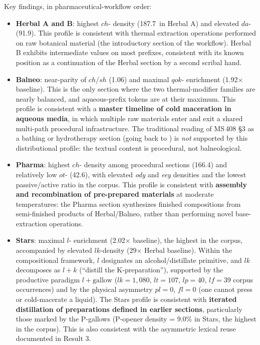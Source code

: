 \documentclass[11pt,a4paper]{article}
\begin{document}
Key findings, in pharmaceutical-workflow order:

\begin{itemize}[leftmargin=*,itemsep=4pt]
\item \textbf{Herbal A and B}: highest $ch$- density (187.7\textperthousand\ in Herbal A) and elevated $da$- (91.9\textperthousand). This profile is consistent with thermal extraction operations performed on raw botanical material (the introductory section of the workflow). Herbal B exhibits intermediate values on most prefixes, consistent with its known position as a continuation of the Herbal section by a second scribal hand.

\item \textbf{Balneo}: near-parity of $ch$/$sh$ (1.06) and maximal $qok$- enrichment (1.92$\times$ baseline). This is the only section where the two thermal-modifier families are nearly balanced, and aqueous-prefix tokens are at their maximum. This profile is consistent with a \textbf{master timeline of cold maceration in aqueous media}, in which multiple raw materials enter and exit a shared multi-path procedural infrastructure. The traditional reading of MS\,408 \S3 as a bathing or hydrotherapy section (going back to \citealp{Newbold1928,DImperio1978}) is \textit{not} supported by this distributional profile: the textual content is procedural, not balneological.

\item \textbf{Pharma}: highest $ch$- density among procedural sections (166.4\textperthousand) and relatively low $ot$- (42.6\textperthousand), with elevated \textit{ody} and \textit{eey} densities and the lowest passive/active ratio in the corpus. This profile is consistent with \textbf{assembly and recombination of pre-prepared materials} at moderate temperatures: the Pharma section synthesizes finished compositions from semi-finished products of Herbal/Balneo, rather than performing novel base-extraction operations.

\item \textbf{Stars}: maximal $l$- enrichment (2.02$\times$ baseline), the highest in the corpus, accompanied by elevated $lk$-density (29$\times$ Herbal baseline). Within the compositional framework, $l$ designates an alcohol/distillate primitive, and $lk$ decomposes as $l + k$ (``distill the K-preparation''), supported by the productive paradigm $l + \mathrm{gallow}$ ($lk = 1{,}080$, $lt = 107$, $lp = 40$, $lf = 39$ corpus occurrences) and by the physical asymmetry $pl = 0$, $fl = 0$ (one cannot press or cold-macerate a liquid). The Stars profile is consistent with \textbf{iterated distillation of preparations defined in earlier sections}, particularly those marked by the P-gallows (P-opener density = 9.0\% in Stars, the highest in the corpus). This is also consistent with the asymmetric lexical reuse documented in Result 3.


\end{itemize}
\end{document}
